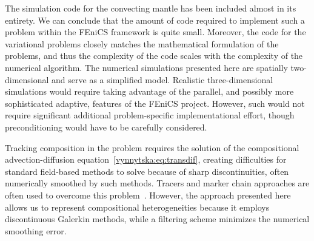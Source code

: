 The simulation code for the convecting mantle has been included almost
in its entirety. We can conclude that the amount of code required
to implement such a problem within the FEniCS framework is quite
small. Moreover, the code for the variational problems closely matches
the mathematical formulation of the problems, and thus the complexity
of the code scales with the complexity of the numerical algorithm.
The numerical simulations presented here are spatially two-dimensional and
serve as a simplified model. Realistic three-dimensional simulations would
require taking advantage of the parallel, and possibly more sophisticated
adaptive, features of the FEniCS project. However, such would not require
significant additional problem-specific implementational effort, though
preconditioning would have to be carefully considered.

Tracking composition in the problem requires the solution of the
compositional advection-diffusion
equation~\eqref{vynnytska:eq:transdif}, creating difficulties for
standard field-based methods to solve because of sharp
discontinuities, often numerically smoothed by such methods.  Tracers
and marker chain approaches are often used to overcome this
problem~\citep{IsmailZadehTackley2010}. However, the approach
presented here allows us to represent compositional heterogeneities
because it employs discontinuous Galerkin methods, while a filtering
scheme minimizes the numerical smoothing error.

